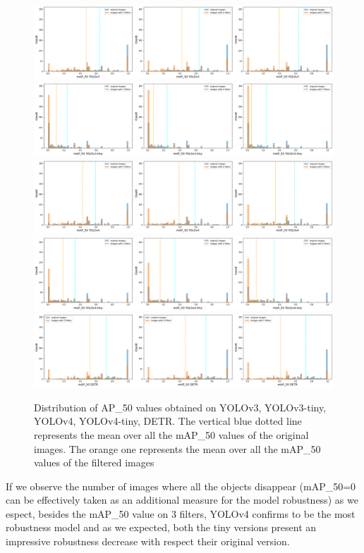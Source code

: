 \begin{figure}[h] 
\centering
\includegraphics[width=1\textwidth]{Experiments/imgs/y3.png}
\includegraphics[width=1\textwidth]{Experiments/imgs/y3t.png}
\includegraphics[width=1\textwidth]{Experiments/imgs/y4.png}
\includegraphics[width=1\textwidth]{Experiments/imgs/y4t.png}
\includegraphics[width=1\textwidth]{Experiments/imgs/detr.png}
\caption{Distribution of AP\_50 values obtained on YOLOv3, YOLOv3-tiny, YOLOv4, YOLOv4-tiny, DETR. The vertical blue dotted line represents the mean over all the mAP\_50 values of the original images. The orange one represents the mean over all the mAP\_50 values of the filtered images}
\label{hysto_objDet}
\end{figure}


If we observe the number of images where all the objects disappear (mAP\_50=0 can be effectively taken as an additional measure for the model robustness) as we espect, besides the mAP\_50 value on 3 filters, YOLOv4 confirms to be the most robustness model and as we expected, both the tiny versions present an impressive robustness decrease with respect their original version. 

